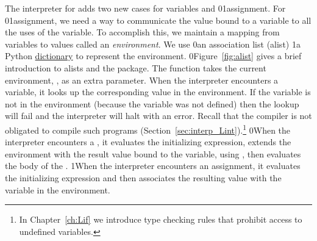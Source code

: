 \documentclass[7x10]{TimesAPriori_MIT}%
\def\racketEd{0}
\def\pythonEd{1}
\def\edition{1}
\newcommand{\racket}[1]{{\if\edition\racketEd{#1}\fi}}
\newcommand{\pythonColor}[0]{}
\newcommand{\python}[1]{{\if\edition\pythonEd\pythonColor #1\fi}}
\numberwithin{theorem}{chapter}
\numberwithin{definition}{chapter}
\numberwithin{equation}{chapter}
\begin{document}
The interpreter for \LangVar{} adds two new cases for
variables and \racket{}\python{assignment}. For
\racket{}\python{assignment}, we need a way to communicate the
value bound to a variable to all the uses of the variable. To
accomplish this, we maintain a mapping from variables to values called
an \emph{environment}.
%
We use
%
\racket{an association list (alist) }%
%
\python{a Python \href{https://docs.python.org/3.10/library/stdtypes.html\#mapping-types-dict}{dictionary} }%
%
to represent the environment.
%
\racket{Figure~\ref{fig:alist} gives a brief introduction to alists
  and the \code{racket/dict} package.}
%
The  function takes the current environment,
, as an extra parameter.  When the interpreter encounters a
variable, it looks up the corresponding value in the environment. If
the variable is not in the environment (because the variable was not
defined) then the lookup will fail and the interpreter will
halt with an error. Recall that the compiler is not obligated to
compile such programs (Section~\ref{sec:interp_Lint}).\footnote{In
  Chapter~\ref{ch:Lif} we introduce type checking rules that
  prohibit access to undefined variables.}
%
\racket{When the interpreter encounters a , it evaluates the
  initializing expression, extends the environment with the result
  value bound to the variable, using \code{dict-set}, then evaluates
  the body of the \key{Let}.}
%
\python{When the interpreter encounters an assignment, it evaluates
   the initializing expression and then associates the resulting value
   with the variable in the environment.}
\end{document}
